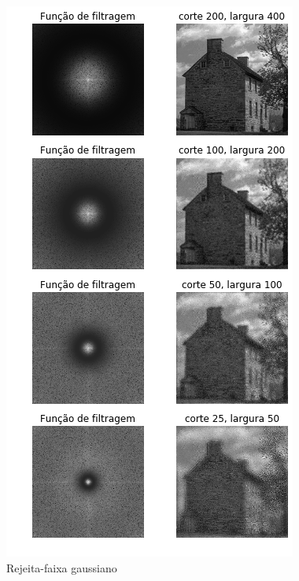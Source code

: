 \documentclass{article}
\begin{document}
\begin{figure}[h!]
    \includegraphics[width=\linewidth]{results/exercicio2rejeita_faixa.png}
    \caption{Rejeita-faixa gaussiano}
    \label{fig:exercicio24}
\end{figure}



\end{document}
